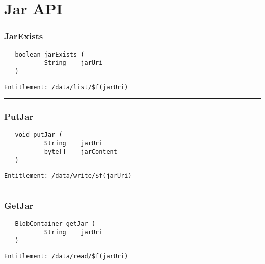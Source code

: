 \chapter{Jar API}

\subsection{JarExists}
\label{Api:JarExists}
\begin{verbatim}
   boolean jarExists (
           String    jarUri
   )
\end{verbatim}
\begin{Verbatim}[fontsize=\small, formatcom=\color{Maroon}]
  Entitlement: /data/list/$f(jarUri)
\end{Verbatim}



\rule{12cm}{2pt}
\subsection{PutJar}
\label{Api:PutJar}
\begin{verbatim}
   void putJar (
           String    jarUri
           byte[]    jarContent
   )
\end{verbatim}
\begin{Verbatim}[fontsize=\small, formatcom=\color{Maroon}]
  Entitlement: /data/write/$f(jarUri)
\end{Verbatim}



\rule{12cm}{2pt}
\subsection{GetJar}
\label{Api:GetJar}
\begin{verbatim}
   BlobContainer getJar (
           String    jarUri
   )
\end{verbatim}
\begin{Verbatim}[fontsize=\small, formatcom=\color{Maroon}]
  Entitlement: /data/read/$f(jarUri)
\end{Verbatim}



